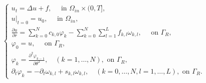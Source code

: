 \documentclass[a4paper,15pt,twoside,zihao=-4]{article}
\begin{document}
\begin{equation}
\left\{\begin{array}{l}
u_{t}=\Delta u+f, \quad \text { in } \Omega_{i n} \times(0, T], \\
\left.u\right|_{t=0}=u_{0}, \quad \text { in } \Omega_{i n}, \\
\displaystyle\frac{\partial u}{\partial r}=\sum_{k=0}^{N} c_{k, 0} \varphi_{k}-\sum_{k=0}^{N} \sum_{l=1}^{L} f_{k, l} \omega_{k, l}, \quad \text { on } \Gamma_{R}, \\
\varphi_{0}=u, \quad \text { on } \Gamma_{R}, \\
\displaystyle\varphi_{k}=\frac{\partial^{2} \varphi_{k-1}}{\partial \theta^{2}}, \quad(k=1, \ldots, N), \text { on } \Gamma_{R}, \\
\displaystyle\partial_{t} \varphi_{k}=-\partial_{t} \omega_{k, l}+s_{k, l} \omega_{k, l}, 
\quad(k=0, \ldots, N, l=1, \ldots, L), \text { on } \Gamma_{R} .
\end{array}\right.
\end{equation}
\clearpage
\end{document}
